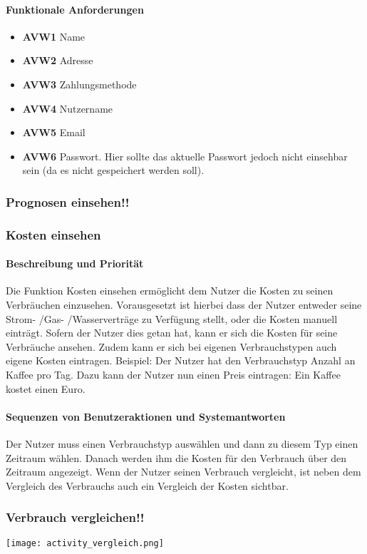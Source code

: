 \paragraph{Funktionale Anforderungen}
\begin{itemize}
	\item \textbf{AVW1} Name
	\item \textbf{AVW2} Adresse
	\item \textbf{AVW3} Zahlungsmethode
	\item \textbf{AVW4} Nutzername
	\item \textbf{AVW5} Email
	\item \textbf{AVW6} Passwort. Hier sollte das aktuelle Passwort jedoch nicht einsehbar sein (da es nicht gespeichert werden soll).
\end{itemize}
\subsubsection{Prognosen einsehen!!}

\subsubsection{Kosten einsehen}
\paragraph{Beschreibung und Priorität}
Die Funktion Kosten einsehen ermöglicht dem Nutzer die Kosten zu seinen Verbräuchen einzusehen. Vorausgesetzt ist hierbei dass der Nutzer entweder seine Strom- /Gas- /Wasserverträge zu Verfügung stellt, oder die Kosten manuell einträgt. Sofern der Nutzer dies getan hat, kann er sich die Kosten für seine Verbräuche ansehen. Zudem kann er sich bei eigenen Verbrauchstypen auch eigene Kosten eintragen. Beispiel: Der Nutzer hat den Verbrauchstyp Anzahl an Kaffee pro Tag. Dazu kann der Nutzer nun einen Preis eintragen: Ein Kaffee kostet einen Euro.
\paragraph{Sequenzen von Benutzeraktionen und Systemantworten}
Der Nutzer muss einen Verbrauchstyp auswählen und dann zu diesem Typ einen Zeitraum wählen. Danach werden ihm die Kosten für den Verbrauch über den Zeitraum angezeigt. Wenn der Nutzer seinen Verbrauch vergleicht, ist neben dem Vergleich des Verbrauchs auch ein Vergleich der Kosten sichtbar.

\subsubsection{Verbrauch vergleichen!!}
\texttt{[image: activity\_vergleich.png]}

